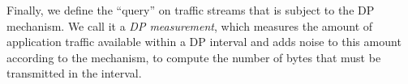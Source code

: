 
Finally, we define the ``query'' on traffic streams that is subject to the DP
mechanism. We call it a {\em DP measurement}, which measures the amount of
application traffic available within a DP interval and adds noise to this amount
according to the mechanism, to compute the number of bytes that must be
transmitted in the interval. 




